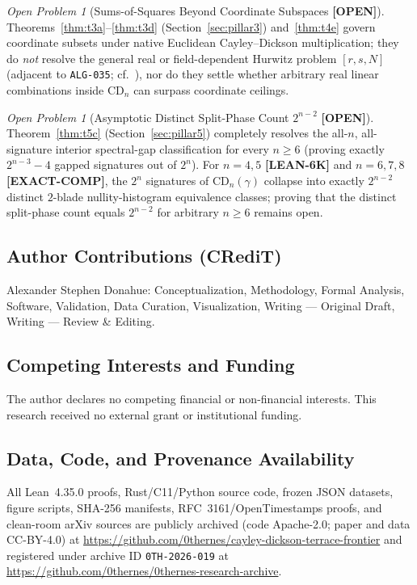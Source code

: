 \documentclass[11pt,reqno]{amsart}
\newcommand{\code}[1]{\textnormal{\texttt{\small\nolinkurl{#1}}}}
\theoremstyle{plain}
\theoremstyle{definition}
\theoremstyle{remark}
\newtheorem{openproblem}[theorem]{Open Problem}
\newcommand{\tagLean}{\mbox{\textsf{\textbf{\color{oiBlue}[LEAN-6K]}}}}
\newcommand{\tagComp}{\mbox{\textsf{\textbf{\color{oiGreen}[EXACT-COMP]}}}}
\newcommand{\tagOpen}{\mbox{\textsf{\textbf{\color{oiVerm}[OPEN]}}}}
\newcommand{\CD}{\mathrm{CD}}
\begin{document}
\begin{openproblem}[Sums-of-Squares Beyond Coordinate Subspaces \tagOpen]
Theorems~\ref{thm:t3a}--\ref{thm:t3d} (Section~\ref{sec:pillar3}) and~\ref{thm:t4e} govern coordinate subsets under native
Euclidean Cayley--Dickson multiplication; they do \emph{not} resolve the general real or
field-dependent Hurwitz problem $[r, s, N]$ (adjacent to \code{ALG-035};
cf.~\cite{yiu1990,zhangzhu2026hurwitz}), nor do they settle whether arbitrary real linear
combinations inside $\CD_n$ can surpass coordinate ceilings.
\end{openproblem}

\begin{openproblem}[Asymptotic Distinct Split-Phase Count $2^{n-2}$ \tagOpen]
Theorem~\ref{thm:t5c} (Section~\ref{sec:pillar5}) completely resolves the all-$n$, all-signature
interior spectral-gap classification for every $n \ge 6$ (proving exactly $2^{n-3} - 4$ gapped
signatures out of $2^n$). For $n = 4, 5$ \tagLean{} and $n = 6, 7, 8$ \tagComp{}, the $2^n$
signatures of $\CD_n(\gamma)$ collapse into exactly $2^{n-2}$ distinct $2$-blade
nullity-histogram equivalence classes; proving that the distinct split-phase count equals
$2^{n-2}$ for arbitrary $n \ge 6$ remains open.
\end{openproblem}

\subsection*{Author Contributions (CRediT)}
Alexander Stephen Donahue: Conceptualization, Methodology, Formal Analysis, Software, Validation,
Data Curation, Visualization, Writing --- Original Draft, Writing --- Review \& Editing.

\subsection*{Competing Interests and Funding}
The author declares no competing financial or non-financial interests. This research received no
external grant or institutional funding.

\subsection*{Data, Code, and Provenance Availability}
All Lean~4.35.0 proofs, Rust/C11/Python source code, frozen JSON datasets, figure scripts,
SHA-256 manifests, RFC~3161/OpenTimestamps proofs, and clean-room arXiv sources are publicly
archived (code Apache-2.0; paper and data CC-BY-4.0) at
\url{https://github.com/0thernes/cayley-dickson-terrace-frontier} and registered under archive
ID \texttt{0TH-2026-019} at \url{https://github.com/0thernes/0thernes-research-archive}.
\end{document}
